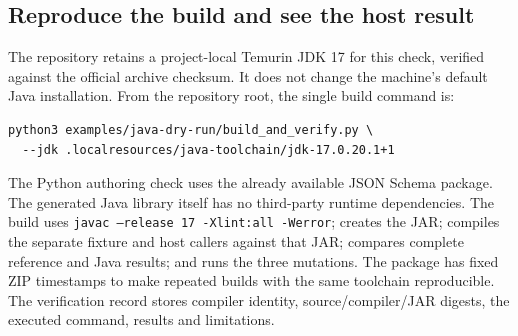 \subsection{Reproduce the build and see the host result}
\label{merge:P-03d-java-delivery:04}


The repository retains a project-local Temurin JDK 17 for this check, verified
against the official archive checksum. It does not change the machine's default
Java installation. From the repository root, the single build command is:

\begin{minipage}{\textwidth}
\begin{lstlisting}
python3 examples/java-dry-run/build_and_verify.py \
  --jdk .localresources/java-toolchain/jdk-17.0.20.1+1
\end{lstlisting}
\end{minipage}

The Python authoring check uses the already available JSON Schema package. The
generated Java library itself has no third-party runtime dependencies. The build
uses \texttt{javac --release 17 -Xlint:all -Werror}; creates the JAR; compiles
the separate fixture and host callers against that JAR; compares complete
reference and Java results; and runs the three mutations. The package has fixed
ZIP timestamps to make repeated builds with the same toolchain reproducible.
The verification record stores compiler identity, source/compiler/JAR digests,
the executed command, results and limitations.

